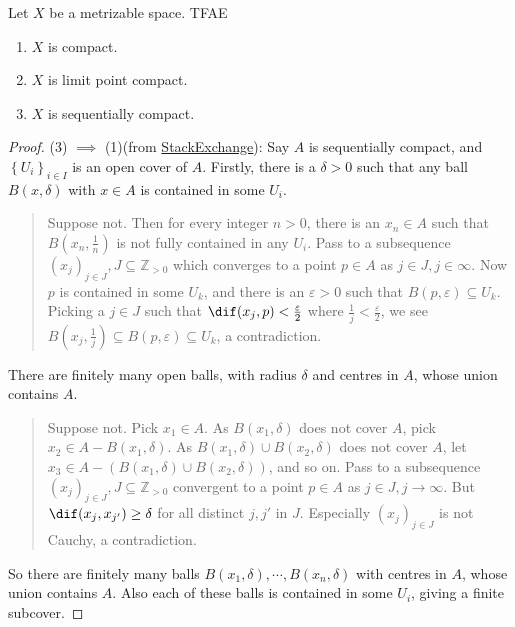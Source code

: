 \begin{theorem}
  Let \( X \) be a metrizable space.
  TFAE
  \begin{enumerate}
    \item \( X \) is compact.
    \item \( X \) is limit point compact.
    \item \( X \) is sequentially compact.
  \end{enumerate}
\end{theorem}
\begin{proof}
  (3) \( \implies \) (1)(from \href{https://math.stackexchange.com/questions/164472/proving-that-sequentially-compact-spaces-are-compact}{StackExchange}): Say \( A \) is sequentially compact, and \( \left\lbrace U_i \right\rbrace_{i \in I} \) is an open cover of \( A \).
  Firstly, there is a \( \delta > 0 \) such that any ball \( B(x, \delta) \) with \( x \in A \) is contained in some \( U_i \).
  \begin{quote}
    Suppose not.
    Then for every integer \( n > 0 \), there is an \( x_n \in A \) such that \( B(x_n, \frac{1}{n}) \) is not fully contained in any \( U_i \).
    Pass to a subsequence \( (x_j)_{j \in J}, J \subseteq \mathbb{Z}_{> 0} \) which converges to a point \( p \in A \) as \( j \in J, j \in \infty \).
    Now \( p \) is contained in some \( U_k \), and there is an \( \varepsilon > 0 \) such that \( B(p, \varepsilon) \subseteq U_k \).
    Picking a \( j \in J \) such that \( \dif(x_j, p) < \frac{\varepsilon}{2} \) where \( \frac{1}{j} < \frac{\varepsilon}{2} \), we see \( B(x_j, \frac{1}{j}) \subseteq B(p, \varepsilon) \subseteq U_k \), a contradiction.
  \end{quote}
  There are finitely many open balls, with radius \( \delta \) and centres in \( A \), whose union contains \( A \).
  \begin{quote}
    Suppose not.
    Pick \( x_1 \in A \).
    As \( B(x_1, \delta) \) does not cover \( A \), pick \( x_2 \in A - B(x_1, \delta) \).
    As \( B(x_1, \delta) \cup B(x_2, \delta) \) does not cover \( A \), let \( x_3 \in A - (B(x_1, \delta) \cup B(x_2, \delta)) \), and so on.
    Pass to a subsequence \( (x_j)_{j \in J}, J \subseteq \mathbb{Z}_{> 0} \) convergent to a point \( p \in A \) as \( j \in J, j \to \infty \).
    But \( \dif(x_j, x_{j'}) \geq \delta \) for all distinct \( j, j' \) in \( J \).
    Especially \( (x_j)_{j \in J} \) is not Cauchy, a contradiction.
  \end{quote}
  So there are finitely many balls \( B(x_1, \delta), \cdots, B(x_n, \delta) \) with centres in \( A \), whose union contains \( A \).
  Also each of these balls is contained in some \( U_i \), giving a finite subcover.
\end{proof}

